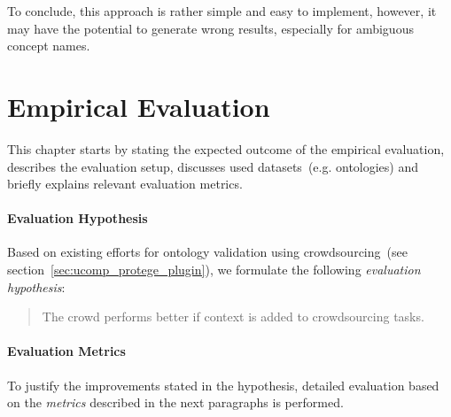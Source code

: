 \documentclass[draft,final]{vutinfth} %
\begin{document}
To conclude, this approach is rather simple and easy to implement, however, it may have the potential to generate wrong results, especially for ambiguous concept names. 


\chapter{Empirical Evaluation}
This chapter starts by stating the expected outcome of the empirical evaluation, describes the evaluation setup, discusses used datasets~(e.g. ontologies) and briefly explains relevant evaluation metrics. 

\subsubsection{Evaluation Hypothesis}
Based on existing efforts for ontology validation using crowdsourcing~(see section~\ref{sec:ucomp_protege_plugin}), we formulate the following \textit{evaluation hypothesis}:
\begin{quotation}
	The crowd performs better if context is added to crowdsourcing tasks.
\end{quotation}

\subsubsection{Evaluation Metrics}
To justify the improvements stated in the hypothesis, detailed evaluation based on the \textit{metrics} described in the next paragraphs is performed. 
\end{document}
